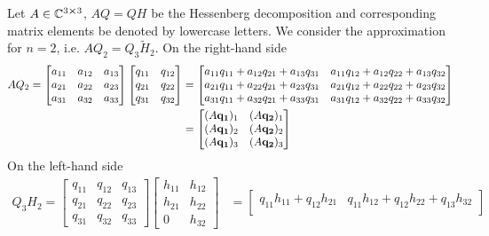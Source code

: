 \begin{example}
	Let \(A\in \mathbb{C}^{3\cross 3}\), \(AQ=QH\) be the Hessenberg decomposition and corresponding matrix elements
	be denoted by lowercase letters. We consider the approximation for \(n = 2\), i.e. \(AQ_2 = Q_3 \tilde{H}_2\).
	On the right-hand side
	\begin{align*}
		AQ_2 = 
		\begin{bmatrix}
			a_{11} & a_{12} & a_{13} \\
			a_{21} & a_{22} & a_{23} \\
			a_{31} & a_{32} & a_{33}
			\end{bmatrix}
			\begin{bmatrix}
			q_{11} & q_{12} \\
			q_{21} & q_{22} \\
			q_{31} & q_{32}
			\end{bmatrix}
			&=
			\begin{bmatrix}
			a_{11}q_{11} + a_{12}q_{21} + a_{13}q_{31} & a_{11}q_{12} + a_{12}q_{22} + a_{13}q_{32} \\
			a_{21}q_{11} + a_{22}q_{21} + a_{23}q_{31} & a_{21}q_{12} + a_{22}q_{22} + a_{23}q_{32} \\
			a_{31}q_{11} + a_{32}q_{21} + a_{33}q_{31} & a_{31}q_{12} + a_{32}q_{22} + a_{33}q_{32}
			\end{bmatrix} \\
			&=
			\begin{bmatrix}
				(A\vectorbold{q_1})_1 & (A\vectorbold{q_2})_1 \\
				(A\vectorbold{q_1})_2 & (A\vectorbold{q_2})_2 \\
				(A\vectorbold{q_1})_3 & (A\vectorbold{q_2})_3
			\end{bmatrix}
	\end{align*}
	On the left-hand side
	\begin{align*}
		Q_3 H_2 = 
		\begin{bmatrix}
			q_{11} & q_{12} & q_{13} \\
			q_{21} & q_{22} & q_{23} \\
			q_{31} & q_{32} & q_{33}
			\end{bmatrix}
			\begin{bmatrix}
			h_{11} & h_{12} \\
			h_{21} & h_{22} \\
			0 & h_{32}
			\end{bmatrix}
			&=
			\begin{bmatrix}
				q_{11}h_{11} + q_{12}h_{21} & q_{11}h_{12} + q_{12}h_{22} + q_{13}h_{32} \\

\end{bmatrix}
\end{align*}
\end{example}
